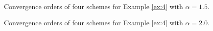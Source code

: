 	
\begin{figure}[H]
	\begin{center}
	\caption{Convergence orders of four schemes for Example \ref{ex:4} with $\alpha=1.5$.} \label{fig:7}
	\end{center}
	\end{figure}
	
	\begin{figure}[H]
	\begin{center}
	\caption{Convergence orders of four schemes for Example \ref{ex:4} with $\alpha=2.0$.} \label{fig:8}
	\end{center}
	\end{figure}

